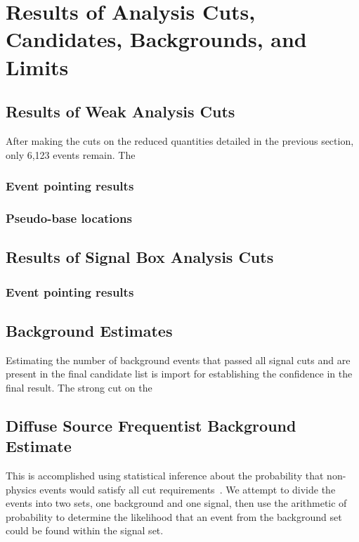 			
\chapter{Results of Analysis Cuts, Candidates, Backgrounds, and Limits}


\section{Results of Weak Analysis Cuts}
		After making the cuts on the reduced quantities detailed in the previous section, only 6,123 events remain.  The 

	
	\subsection{Event pointing results}
	

	\subsection{Pseudo-base locations}


\section{Results of Signal Box Analysis Cuts}

	\subsection{Event pointing results}
	

\section{Background Estimates}
	Estimating the number of background events that passed all signal cuts and are present in the final candidate list is import for establishing the confidence in the final result.  The strong cut on the 

\section{Diffuse Source Frequentist Background Estimate}
	 This is accomplished using statistical inference about the probability that non-physics events would satisfy all cut requirements~\cite{ClassicalStatisticalEstimation}.  We attempt to divide the events into two sets, one background and one signal, then use the arithmetic of probability to determine the likelihood that an event from the background set could be found within the signal set.  

